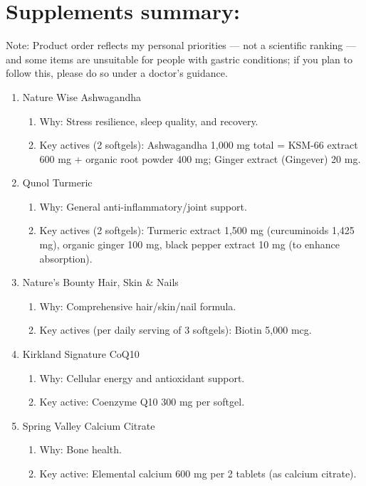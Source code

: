 \section{Supplements summary:} 
\label{sec:Supplements}
Note: Product order reflects my personal priorities — not a scientific ranking — and some items are unsuitable for people with gastric conditions; if you plan to follow this, please do so under a doctor’s guidance.
\begin{enumerate}
    \item Nature Wise Ashwagandha  
    \begin{enumerate}
        \item Why: Stress resilience, sleep quality, and recovery.
        \item Key actives (2 softgels): Ashwagandha 1,000 mg total = KSM-66 extract 600 mg + organic root powder 400 mg; Ginger extract (Gingever) 20 mg.
    \end{enumerate}

    \item Qunol Turmeric
    \begin{enumerate}
        \item Why: General anti-inflammatory/joint support.
        \item Key actives (2 softgels): Turmeric extract 1,500 mg (curcuminoids 1,425 mg), organic ginger 100 mg, black pepper extract 10 mg (to enhance absorption).
    \end{enumerate}

    \item Nature’s Bounty Hair, Skin \& Nails 
    \begin{enumerate}
        \item Why: Comprehensive hair/skin/nail formula.
        \item Key actives (per daily serving of 3 softgels): Biotin 5,000 mcg.
    \end{enumerate}
    
    \item Kirkland Signature CoQ10 
    \begin{enumerate}
        \item Why: Cellular energy and antioxidant support.
        \item Key active: Coenzyme Q10 300 mg per softgel.
    \end{enumerate}
    
    \item Spring Valley Calcium Citrate
    \begin{enumerate}
        \item Why: Bone health.
        \item Key active: Elemental calcium 600 mg per 2 tablets (as calcium citrate).
    \end{enumerate}
    

\end{enumerate}
